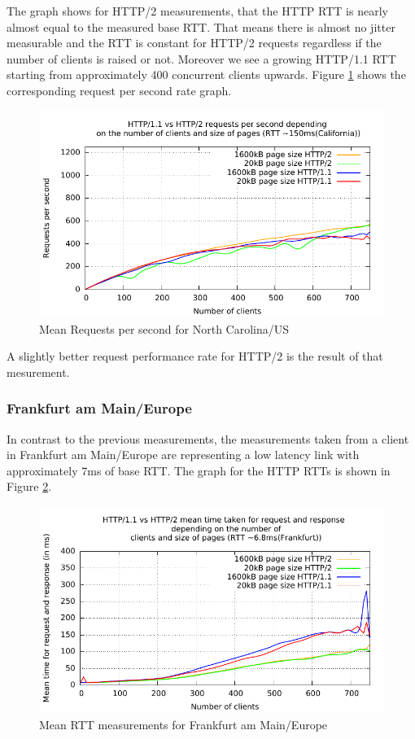 The graph shows for HTTP/2 measurements, that the HTTP RTT is nearly almost equal to the measured base RTT. That means there is almost no jitter measurable and the RTT is constant for HTTP/2 requests regardless if the number of clients is raised or not. Moreover we see a growing HTTP/1.1 RTT starting from approximately 400 concurrent clients upwards. Figure \ref{fig:reqps-na} shows the corresponding request per second rate graph.

\begin{figure}[H]
	\centering
	\includegraphics[scale=1,trim=0.0cm .0cm .0cm .0cm,clip]{images/reqps-na.pdf}
	\caption{Mean Requests per second for North Carolina/US}
	\label{fig:reqps-na}
\end{figure}

A slightly better request performance rate for HTTP/2 is the result of that mesurement. 

\subsubsection{Frankfurt am Main/Europe}

In contrast to the previous measurements, the measurements taken from a client in Frankfurt am Main/Europe are representing a low latency link with approximately 7ms of base RTT. The graph for the HTTP RTTs is shown in Figure \ref{fig:latency-europe}.

\begin{figure}[H]
	\centering
	\includegraphics[scale=1,trim=0.0cm .0cm .0cm .0cm,clip]{images/latency-frankfurt.pdf}
	\caption{Mean RTT measurements for Frankfurt am Main/Europe}
	\label{fig:latency-europe}
\end{figure}

